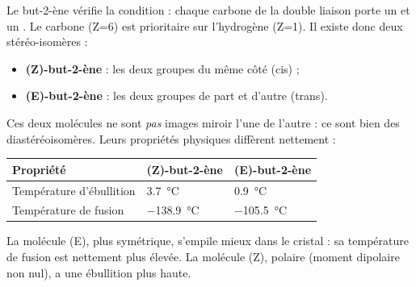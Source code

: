 \documentclass[11pt]{article}
\newcommand{\cle}[1]{{\popxbold\color{popdark}#1}}
\begin{document}
\begin{exemplebox}
Le but-2-ène  vérifie la condition : chaque carbone de la double liaison porte un  et un . Le carbone (Z=6) est prioritaire sur l'hydrogène (Z=1). Il existe donc deux stéréo-isomères :
\begin{itemize}
\item \textbf{(Z)-but-2-ène} : les deux groupes  du même côté (cis) ;
\item \textbf{(E)-but-2-ène} : les deux groupes  de part et d'autre (trans).
\end{itemize}
Ces deux molécules ne sont \emph{pas} images miroir l'une de l'autre : ce sont bien des \cle{diastéréoisomères}. Leurs propriétés physiques diffèrent nettement :
\begin{center}
\begin{tabularx}{\linewidth}{|l|X|X|}
\hline
\rowcolor{popblueL} \textbf{Propriété} & \textbf{(Z)-but-2-ène} & \textbf{(E)-but-2-ène} \\
\hline
Température d'ébullition & \SI{3,7}{\celsius} & \SI{0,9}{\celsius} \\
\hline
Température de fusion & \SI{-138,9}{\celsius} & \SI{-105,5}{\celsius} \\
\hline
\end{tabularx}
\end{center}
La molécule (E), plus symétrique, s'empile mieux dans le cristal : sa température de fusion est nettement plus élevée. La molécule (Z), polaire (moment dipolaire non nul), a une ébullition plus haute.
\end{exemplebox}
\end{document}
